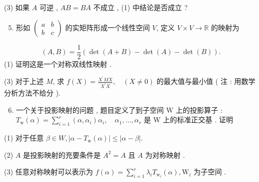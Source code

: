 \documentclass[10pt]{article}
\begin{document}
(3)  如果  $A$  可逆 , $A B=B A$  不成立 , (1)  中结论是否成立 ?

\begin{enumerate}
  \setcounter{enumi}{4}
  \item  形如  $\left(\begin{array}{ll}a & b \\ b & c\end{array}\right)$  的实矩阵形成一个线性空间  $V$,  定义  $V \times V \rightarrow \mathbb{R}$  的映射为 
\end{enumerate}
$$
(A, B)=\frac{1}{2}(\operatorname{det}(A+B)-\operatorname{det}(A)-\operatorname{det}(B)) .
$$
(1)  证明这是一个对称双线性映射 .


(3)  对于上述  $M$,  求  $f(X)=\frac{X^{\prime} M X}{X^{\prime} X}, \quad(X \neq 0)$  的最大值与最小值  ( 注 :  用数学分析方法不给分 ).

\begin{enumerate}
  \setcounter{enumi}{5}
  \item  一个关于投影映射的问题 ,  题目定义了到子空间  $\mathrm{W}$  上的投影算子 : $T_{\mathrm{w}}(\alpha)=\sum_{i=1}^{r}\left(\alpha, \alpha_{i}\right) \alpha_{i}, \quad \alpha_{1}, \ldots, \alpha_{r}$  是  $\mathrm{W}$  上的标准正交基 .  证明 
\end{enumerate}
(1)  对于任意  $\beta \in W,\left|\alpha-T_{\mathrm{w}}(\alpha)\right| \leq|\alpha-\beta|$.

(2) $A$  是投影映射的充要条件是  $A^{2}=A$  且  $A$  为对称映射 .

(3)  任意对称映射可以表示为  $f(\alpha)=\sum_{i=1}^{r} \lambda_{i} T_{\mathrm{w}_{i}}(\alpha), \mathrm{W}_{i}$  为子空间 .
\end{document}
